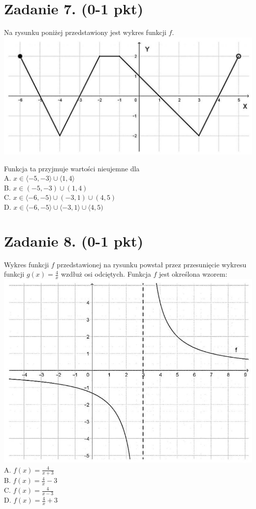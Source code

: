 \documentclass[10pt]{article}
\begin{document}
\section*{Zadanie 7. (0-1 pkt)}
Na rysunku poniżej przedstawiony jest wykres funkcji \(f\).\\
\includegraphics[max width=\textwidth, center]{2024_11_21_997c30e0b98e62837d84g-04}

Funkcja ta przyjmuje wartości nieujemne dla\\
A. \(x \in\langle-5,-3\rangle \cup\langle 1,4\rangle\)\\
B. \(x \in(-5,-3) \cup(1,4)\)\\
C. \(x \in\langle-6,-5) \cup(-3,1) \cup(4,5)\)\\
D. \(x \in\langle-6,-5\rangle \cup\langle-3,1\rangle \cup\langle 4,5)\)

\section*{Zadanie 8. (0-1 pkt)}
Wykres funkcji \(f\) przedstawionej na rysunku powstał przez przesunięcie wykresu funkcji \(g(x)=\frac{4}{x}\) wzdłuż osi odciętych. Funkcja \(f\) jest określona wzorem:\\
\includegraphics[max width=\textwidth, center]{2024_11_21_997c30e0b98e62837d84g-04(1)}\\
A. \(f(x)=\frac{4}{x+3}\)\\
B. \(f(x)=\frac{4}{x}-3\)\\
C. \(f(x)=\frac{4}{x-3}\)\\
D. \(f(x)=\frac{4}{x}+3\)
\end{document}
